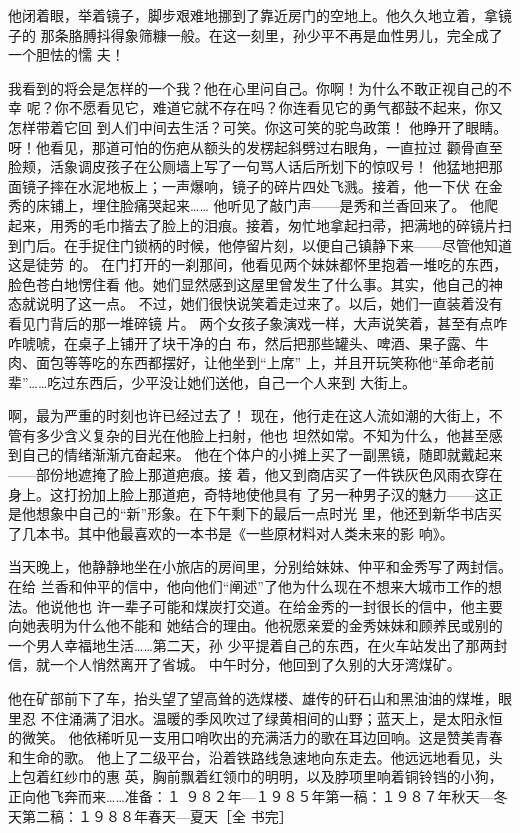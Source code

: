  他闭着眼，举着镜子，脚步艰难地挪到了靠近房门的空地上。他久久地立着，拿镜子的
 那条胳膊抖得象筛糠一般。在这一刻里，孙少平不再是血性男儿，完全成了一个胆怯的懦
 夫！
 
 我看到的将会是怎样的一个我？他在心里问自己。你啊！为什么不敢正视自己的不幸
 呢？你不愿看见它，难道它就不存在吗？你连看见它的勇气都鼓不起来，你又怎样带着它回
 到人们中间去生活？可笑。你这可笑的驼鸟政策！
 他睁开了眼睛。呀！他看见，那道可怕的伤疤从额头的发楞起斜劈过右眼角，一直拉过
 颧骨直至脸颊，活象调皮孩子在公厕墙上写了一句骂人话后所划下的惊叹号！
 他猛地把那面镜子摔在水泥地板上；一声爆响，镜子的碎片四处飞溅。接着，他一下伏
 在金秀的床铺上，埋住脸痛哭起来……
 他听见了敲门声——是秀和兰香回来了。
 他爬起来，用秀的毛巾揩去了脸上的泪痕。接着，匆忙地拿起扫帚，把满地的碎镜片扫
 到门后。在手捉住门锁柄的时候，他停留片刻，以便自己镇静下来——尽管他知道这是徒劳
 的。
 在门打开的一刹那间，他看见两个妹妹都怀里抱着一堆吃的东西，脸色苍白地愣住看
 他。她们显然感到这屋里曾发生了什么事。其实，他自己的神态就说明了这一点。
 不过，她们很快说笑着走过来了。以后，她们一直装着没有看见门背后的那一堆碎镜
 片。
 两个女孩子象演戏一样，大声说笑着，甚至有点咋咋唬唬，在桌子上铺开了块干净的白
 布，然后把那些罐头、啤酒、果子露、牛肉、面包等等吃的东西都摆好，让他坐到“上席”
 上，并且开玩笑称他“革命老前辈”……吃过东西后，少平没让她们送他，自己一个人来到
 大街上。
 
 啊，最为严重的时刻也许已经过去了！
 现在，他行走在这人流如潮的大街上，不管有多少含义复杂的目光在他脸上扫射，他也
 坦然如常。不知为什么，他甚至感到自己的情绪渐渐亢奋起来。
 他在个体户的小摊上买了一副黑镜，随即就戴起来——部份地遮掩了脸上那道疤痕。接
 着，他又到商店买了一件铁灰色风雨衣穿在身上。这打扮加上脸上那道疤，奇特地使他具有
 了另一种男子汉的魅力——这正是他想象中自己的“新”形象。在下午剩下的最后一点时光
 里，他还到新华书店买了几本书。其中他最喜欢的一本书是《一些原材料对人类未来的影
 响》。
 
 当天晚上，他静静地坐在小旅店的房间里，分别给妹妹、仲平和金秀写了两封信。在给
 兰香和仲平的信中，他向他们“阐述”了他为什么现在不想来大城市工作的想法。他说他也
 许一辈子可能和煤炭打交道。在给金秀的一封很长的信中，他主要向她表明为什么他不能和
 她结合的理由。他祝愿亲爱的金秀妹妹和顾养民或别的一个男人幸福地生活……第二天，孙
 少平提着自己的东西，在火车站发出了那两封信，就一个人悄然离开了省城。
 中午时分，他回到了久别的大牙湾煤矿。
 
 他在矿部前下了车，抬头望了望高耸的选煤楼、雄传的矸石山和黑油油的煤堆，眼里忍
 不住涌满了泪水。温暖的季风吹过了绿黄相间的山野；蓝天上，是太阳永恒的微笑。
 他依稀听见一支用口哨吹出的充满活力的歌在耳边回响。这是赞美青春和生命的歌。
 他上了二级平台，沿着铁路线急速地向东走去。他远远地看见，头上包着红纱巾的惠
 英，胸前飘着红领巾的明明，以及脖项里响着铜铃铛的小狗，正向他飞奔而来……准备：１
 ９８２年—１９８５年第一稿：１９８７年秋天—冬天第二稿：１９８８年春天—夏天［全
 书完］
 
